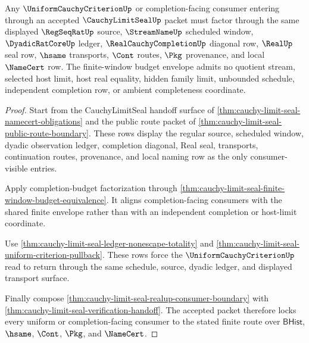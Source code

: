 \begin{theorem}
\label{thm:cauchy-limit-seal-consumer-uniform-route-lock}
Any $\UniformCauchyCriterionUp$ or completion-facing consumer entering through an accepted $\CauchyLimitSealUp$ packet must factor through the same displayed $\RegSeqRatUp$ source, $\StreamNameUp$ scheduled window, $\DyadicRatCoreUp$ ledger, $\RealCauchyCompletionUp$ diagonal row, $\RealUp$ seal row, $\hsame$ transports, $\Cont$ routes, $\Pkg$ provenance, and local $\NameCert$ row. The finite-window budget envelope admits no quotient stream, selected host limit, host real equality, hidden family limit, unbounded schedule, independent completion row, or ambient completeness coordinate.
\end{theorem}
\begin{proof}
Start from the CauchyLimitSeal handoff surface of \autoref{thm:cauchy-limit-seal-namecert-obligations} and the public route packet of \autoref{thm:cauchy-limit-seal-public-route-boundary}. These rows display the regular source, scheduled window, dyadic observation ledger, completion diagonal, Real seal, transports, continuation routes, provenance, and local naming row as the only consumer-visible entries.

Apply completion-budget factorization through \autoref{thm:cauchy-limit-seal-finite-window-budget-equivalence}. It aligns completion-facing consumers with the shared finite envelope rather than with an independent completion or host-limit coordinate.

Use \autoref{thm:cauchy-limit-seal-ledger-nonescape-totality} and \autoref{thm:cauchy-limit-seal-uniform-criterion-pullback}. These rows force the $\UniformCauchyCriterionUp$ read to return through the same schedule, source, dyadic ledger, and displayed transport surface.

Finally compose \autoref{thm:cauchy-limit-seal-realup-consumer-boundary} with \autoref{thm:cauchy-limit-seal-verification-handoff}. The accepted packet therefore locks every uniform or completion-facing consumer to the stated finite route over $\mathsf{BHist}$, $\hsame$, $\Cont$, $\Pkg$, and $\NameCert$.
\end{proof}

